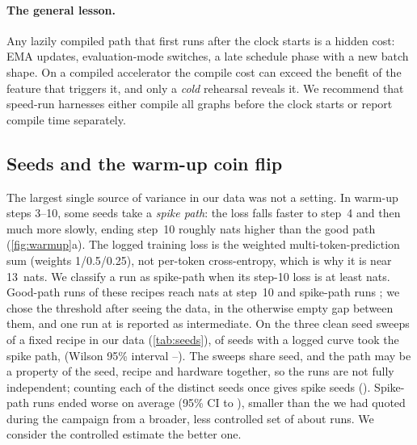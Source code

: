 \paragraph{The general lesson.} Any lazily compiled path that first runs after the clock starts is a hidden cost: EMA
updates, evaluation-mode switches, a late schedule phase with a new batch shape. On a compiled accelerator the compile
cost can exceed the benefit of the feature that triggers it, and only a \emph{cold} rehearsal reveals it. We recommend
that speed-run harnesses either compile all graphs before the clock starts or report compile time separately.

\subsection{Seeds and the warm-up coin flip}
\label{sec:seeds}

The largest single source of variance in our data was not a setting. In warm-up steps 3--10, some seeds take a
\emph{spike path}: the loss falls faster to step~4 and then much more slowly, ending step~10 roughly
 nats higher than the good path (\cref{fig:warmup}a). The logged training loss is the weighted
multi-token-prediction sum (weights 1/0.5/0.25), not per-token cross-entropy, which is why it is near 13~nats. We
classify a run as spike-path when its step-10 loss is at least  nats. Good-path runs of these recipes
reach  nats at step~10 and spike-path runs ; we chose the threshold after seeing the data,
in the otherwise empty gap between them, and one run at  is reported as intermediate. On the three clean seed sweeps
of a fixed recipe in our data (\cref{tab:seeds}),  of  seeds with a logged curve took the
spike path,  (Wilson 95\% interval --). The sweeps share
 seed, and the path may be a property of the seed, recipe and hardware together, so the runs
are not fully independent; counting each of the  distinct seeds once gives
 spike seeds (). Spike-path runs ended  worse on average
(95\% CI  to ), smaller than the \docnum{} we had quoted
during the campaign from a broader, less controlled set of about \docnum{} runs. We consider the
controlled estimate the better one.

